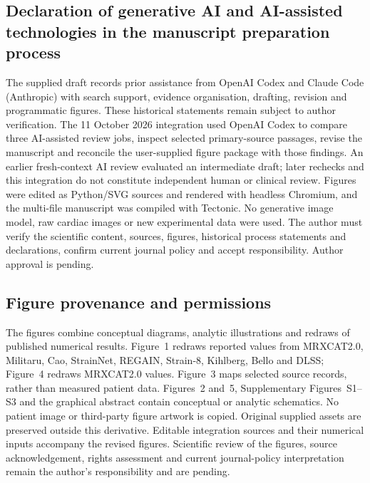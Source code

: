 \documentclass[11pt,a4paper]{article}
\begin{document}
\subsection*{Declaration of generative AI and AI-assisted technologies in the manuscript preparation process}
The supplied draft records prior assistance from OpenAI Codex and Claude Code (Anthropic) with search support, evidence organisation, drafting, revision and programmatic figures. These historical statements remain subject to author verification. The 11 October 2026 integration used OpenAI Codex to compare three AI-assisted review jobs, inspect selected primary-source passages, revise the manuscript and reconcile the user-supplied figure package with those findings. An earlier fresh-context AI review evaluated an intermediate draft; later rechecks and this integration do not constitute independent human or clinical review. Figures were edited as Python/SVG sources and rendered with headless Chromium, and the multi-file manuscript was compiled with Tectonic. No generative image model, raw cardiac images or new experimental data were used. The author must verify the scientific content, sources, figures, historical process statements and declarations, confirm current journal policy and accept responsibility. Author approval is pending.

\subsection*{Figure provenance and permissions}
The figures combine conceptual diagrams, analytic illustrations and redraws of published numerical results. Figure~1 redraws reported values from MRXCAT2.0, Militaru, Cao, StrainNet, REGAIN, Strain-8, Kihlberg, Bello and DLSS; Figure~4 redraws MRXCAT2.0 values. Figure~3 maps selected source records, rather than measured patient data. Figures~2 and~5, Supplementary Figures~S1--S3 and the graphical abstract contain conceptual or analytic schematics. No patient image or third-party figure artwork is copied. Original supplied assets are preserved outside this derivative. Editable integration sources and their numerical inputs accompany the revised figures. Scientific review of the figures, source acknowledgement, rights assessment and current journal-policy interpretation remain the author's responsibility and are pending.

\setlength{\bibsep}{2pt}


\end{document}
